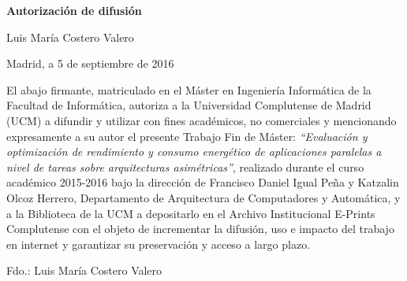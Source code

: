 % 

\cleardoublepage

\thispagestyle{empty}

\begin{center}

{\bf \Huge Autorización de difusión}

\vspace{1cm}

% 
   \large Luis María Costero Valero
      
   \vspace{0.5cm}

% 
   Madrid, a 5 de septiembre de 2016\\

   \vspace{0.5cm} \end{center}

 El abajo firmante, matriculado en el Máster en Ingeniería Informática de
 la Facultad de Informática, autoriza a la Universidad Complutense de
 Madrid (UCM) a difundir y utilizar con fines académicos, no comerciales y
 mencionando expresamente a su autor el presente Trabajo Fin de Máster:
 {\em ``Evaluación y optimización de rendimiento y consumo energético de
   aplicaciones paralelas a nivel de tareas sobre arquitecturas
   asimétricas''}, realizado durante el curso académico 2015-2016 bajo la
 dirección de Francisco Daniel Igual Peña y Katzalin Olcoz Herrero,
 Departamento de Arquitectura de Computadores y Automática, y a la
 Biblioteca de la UCM a depositarlo en el Archivo Institucional E-Prints
 Complutense con el objeto de incrementar la difusión, uso e impacto del
 trabajo en internet y garantizar su preservación y acceso a largo plazo.


\vspace{3cm}
\begin{center}
  Fdo.: Luis María Costero Valero
\end{center}






